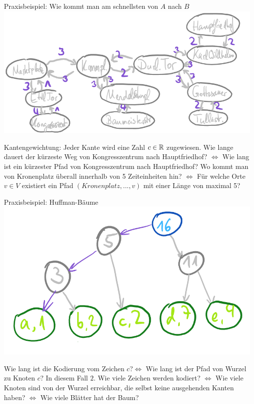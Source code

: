 \begin{frame}{Praxisbeispiel: Wie kommt man am schnellsten von $A$ nach $B$}
	\ip\includegraphics[scale=0.4]{images/graph_beispiel_kvv.png}
	\begin{itemize}
		\pitem Kantengewichtung: Jeder Kante wird eine Zahl $c \in \mathbb{R}$ zugewiesen.
		\pitem Wie lange dauert der kürzeste Weg von Kongresszentrum nach Hauptfriedhof? \pause $\Leftrightarrow$ Wie lang ist ein kürzester Pfad von Kongresszentrum nach Hauptfriedhof?
		\pitem Wo kommt man von Kronenplatz überall innerhalb von 5 Zeiteinheiten hin? \pause $\Leftrightarrow$ Für welche Orte $v \in V$ existiert ein Pfad $(Kronenplatz, ..., v)$ mit einer Länge von maximal 5?
	\end{itemize}
\end{frame}

\begin{frame}{Praxisbeispiel: Huffman-Bäume}
	\ip\includegraphics[scale=0.4]{images/graph_beispiel_huffman.png}
	\begin{itemize}
		\pitem Wie lang ist die Kodierung vom Zeichen $c$?\pause $\Leftrightarrow$ Wie lang ist der Pfad von Wurzel zu Knoten $c$? In diesem Fall $2$.
		\pitem Wie viele Zeichen werden kodiert? \pause $\Leftrightarrow$ Wie viele Knoten sind von der Wurzel erreichbar, die selbst keine ausgehenden Kanten haben? \pause $\Leftrightarrow$ Wie viele Blätter hat der Baum?
	\end{itemize}
\end{frame}


